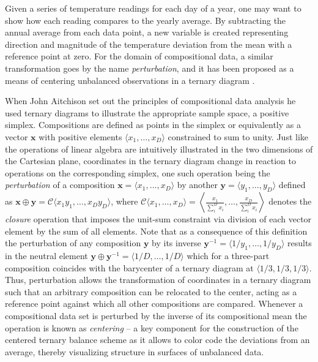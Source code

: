 \documentclass[10pt, twoside, parskip=half]{article}
\begin{document}
Given a series of temperature readings for each day of a year, one may
want to show how each reading compares to the yearly average. By
subtracting the annual average from each data point, a new variable is
created representing direction and magnitude of the temperature
deviation from the mean with a reference point at zero. For the domain
of compositional data, a similar transformation goes by the name
\emph{perturbation}, and it has been proposed as a means of centering
unbalanced observations in a ternary diagram
\citep{VonEynatten2002, PawlowskyGlahn2002}.

When John Aitchison set out the principles of compositional data
analysis \citep{Aitchison1982, Aitchison1986, PawlowskyGlahn2015} he
used ternary diagrams to illustrate the appropriate sample space, a
positive simplex. Compositions are defined as points in the simplex or
equivalently as a vector \(\mathbf{x}\) with positive elements
\(\langle x_1,\ldots,x_D \rangle\) constrained to sum to unity. Just
like the operations of linear algebra are intuitively illustrated in the
two dimensions of the Cartesian plane, coordinates in the ternary
diagram change in reaction to operations on the corresponding simplex,
one such operation being the \emph{perturbation} of a composition
\(\mathbf{x}=\langle x_1, \ldots, x_D \rangle\) by another
\(\mathbf{y}=\langle y_1, \ldots, y_D \rangle\) defined as
\(\mathbf{x}\oplus \mathbf{y}=\mathcal{C}\langle x_1y_1, \ldots, x_Dy_D \rangle\),
where
\(\mathcal{C}\langle x_1, \ldots, x_D \rangle = \left\langle\frac{x_1}{\sum_i^D x_i},\ldots, \frac{x_D}{\sum_i^D x_i}\right\rangle\)
denotes the \emph{closure} operation that imposes the unit-sum
constraint via division of each vector element by the sum of all
elements. Note that as a consequence of this definition the perturbation
of any composition \(\mathbf{y}\) by its inverse
\(\mathbf{y}^{-1}=\langle 1/y_1, \ldots, 1/y_D \rangle\) results in the
neutral element
\(\mathbf{y}\oplus \mathbf{y}^{-1}=\langle 1/D, \ldots, 1/D \rangle\)
which for a three-part composition coincides with the barycenter of a
ternary diagram at \(\langle 1/3, 1/3, 1/3 \rangle\). Thus, perturbation
allows the transformation of coordinates in a ternary diagram such that
an arbitrary composition can be relocated to the center, acting as a
reference point against which all other compositions are compared.
Whenever a compositional data set is perturbed by the inverse of its
compositional mean the operation is known as \emph{centering} -- a key
component for the construction of the centered ternary balance scheme as
it allows to color code the deviations from an average, thereby
visualizing structure in surfaces of unbalanced data.
\end{document}
